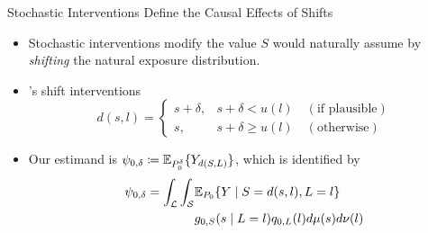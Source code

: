 \documentclass{beamer}
\begin{document}

\begin{frame}[c]{Stochastic Interventions Define the Causal Effects of Shifts}

\begin{center}
\begin{itemize}
  \itemsep8pt
  \item Stochastic interventions modify the value $S$ would naturally assume by
    \textit{shifting} the natural exposure distribution.
  \item \cite{diaz2012population, diaz2018stochastic}'s shift
    interventions\footnotemark
     \begin{equation*}\label{shift_intervention}
       d(s, l) =
         \begin{cases}
           s + \delta, & s + \delta < u(l) \quad (\text{if plausible}) \\
           s, & s + \delta \geq u(l) \quad (\text{otherwise})
         \end{cases}
     \end{equation*}
  \item Our estimand is $\psi_{0,\delta} \coloneqq
    \mathbb{E}_{P_0^{\delta}}\{Y_{d(S,L)}\}$, which is identified by
    \begin{align*}\label{eqn:identification2012}
      \psi_{0,\delta} = \int_{\mathcal{L}} \int_{\mathcal{S}} &\mathbb{E}_{P_0}
        \{Y \mid S = d(s, l), L = l\} \\ &g_{0, S}(s \mid L = l)
        q_{0, L}(l) d\mu(s)d\nu(l)
    \end{align*}
\end{itemize}
\end{center}



\end{frame}
\end{document}
